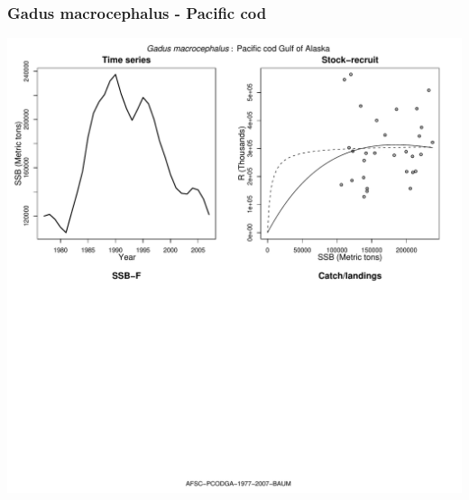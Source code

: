 \subsubsection{Gadus macrocephalus - Pacific cod}
\begin{center}
\includegraphics[width=1.2\textwidth]{../R/figures/AFSC-PCODGA-1977-2007-BAUM.pdf}
\end{center}

